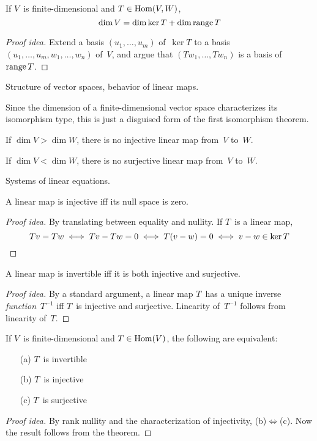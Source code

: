 \begin{thm}
If \(V\)~is finite-dimensional and \(T\in\operatorname{Hom}(V,W)\),
\[\dim V=\dim\ker T+\dim\operatorname{range} T\]
\end{thm}
\begin{proof}[Proof idea]
Extend a basis \((u_1,\ldots,u_m)\) of~\(\ker T\) to a basis \((u_1,\ldots,u_m,w_1,\ldots,w_n)\) of~\(V\), and argue that \((Tw_1,\ldots,Tw_n)\) is a basis of~\(\operatorname{range} T\).
\end{proof}
\begin{app}
Structure of vector spaces, behavior of linear maps.
\end{app}
\begin{rmk}
Since the dimension of a finite-dimensional vector space characterizes its isomorphism type, this is just a disguised form of the first isomorphism theorem.
\end{rmk}
\begin{cor}
If \(\dim V>\dim W\), there is no injective linear map from~\(V\) to~\(W\).
\end{cor}
\begin{cor}
If \(\dim V<\dim W\), there is no surjective linear map from~\(V\) to~\(W\).
\end{cor}
\begin{app}
Systems of linear equations.
\end{app}

\begin{thm}
A linear map is injective iff its null space is zero.
\end{thm}
\begin{proof}[Proof idea]
By translating between equality and nullity. If \(T\)~is a linear map,
\begin{equation*}
Tv=Tw\iff Tv-Tw=0\iff T(v-w)=0\iff v-w\in\ker T\qedhere
\end{equation*}
\end{proof}

\begin{thm}
A linear map is invertible iff it is both injective and surjective.
\end{thm}
\begin{proof}[Proof idea]
By a standard argument, a linear map \(T\)~has a unique inverse \emph{function}~\(T^{-1}\) iff \(T\)~is injective and surjective. Linearity of~\(T^{-1}\) follows from linearity of~\(T\).
\end{proof}
\begin{cor}
If \(V\)~is finite-dimensional and \(T\in\operatorname{Hom}(V)\), the following are equivalent:
\begin{enumerate}[itemsep=0pt]
\item[(a)] \(T\)~is invertible
\item[(b)] \(T\)~is injective
\item[(c)] \(T\)~is surjective
\end{enumerate}
\end{cor}
\begin{proof}[Proof idea]
By rank nullity and the characterization of injectivity, (b)\(\iff\)(c). Now the result follows from the theorem.
\end{proof}

